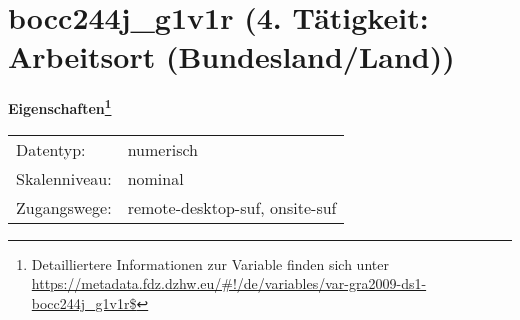 
    \setcounter{footnote}{0}

    \vspace*{-1.8cm}
	\section{bocc244j\_g1v1r (4. Tätigkeit: Arbeitsort (Bundesland/Land))}
	\label{section:bocc244j_g1v1r}



    \vspace*{0.5cm}
    \noindent\textbf{Eigenschaften\footnote{Detailliertere Informationen zur Variable finden sich unter
		\url{https://metadata.fdz.dzhw.eu/\#!/de/variables/var-gra2009-ds1-bocc244j_g1v1r$}}}\\
	\begin{tabularx}{\hsize}{@{}lX}
	Datentyp: & numerisch \\
	Skalenniveau: & nominal \\
	Zugangswege: &
	  remote-desktop-suf, 
	  onsite-suf
 \\
    \end{tabularx}



